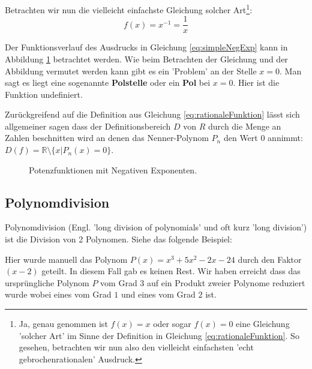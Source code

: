Betrachten wir nun die vielleicht einfachste Gleichung solcher Art\footnote{Ja, genau genommen ist $f(x) = x$ oder sogar $f(x) = 0$ eine Gleichung 'solcher Art' im Sinne der Definition in Gleichung \ref{eq:rationaleFunktion}. So gesehen, betrachten wir nun also den vielleicht einfachsten 'echt gebrochenrationalen' Ausdruck.}:
\begin{equation}
	f(x) = x^{-1} = \frac{1}{x} \label{eq:simpleNegExp}
\end{equation}

Der Funktionsverlauf des Ausdrucks in Gleichung \ref{eq:simpleNegExp} kann in Abbildung \ref{fig:ratio1} betrachtet werden. Wie beim Betrachten der Gleichung und der Abbildung vermutet werden kann gibt es ein 'Problem' an der Stelle $x=0$. Man sagt es liegt eine sogenannte \textbf{Polstelle} oder ein \textbf{Pol} bei $x=0$. Hier ist die Funktion undefiniert. 

Zurückgreifend auf die Definition aus Gleichung \ref{eq:rationaleFunktion} lässt sich allgemeiner sagen dass der Definitionsbereich $D$ von $R$ durch die Menge an Zahlen beschnitten wird an denen das Nenner-Polynom $P_n$ den Wert 0 annimmt: $D(f) = \mathbb{R} \setminus \{x | P_n(x)=0\}$. 


\begin{figure}[H]
	\centering
	
	\caption{Potenzfunktionen mit Negativen Exponenten.}
	\label{fig:ratio1}
\end{figure}





\subsection{Polynomdivision}
Polynomdivision (Engl. 'long division of polynomials' und oft kurz 'long division') ist die Division von 2 Polynomen. 
Siehe das folgende Beispiel:



Hier wurde manuell das Polynom $P(x) = x^{3} + 5 x^{2} - 2 x - 24$ durch den Faktor $(x-2)$ geteilt. In diesem Fall gab es keinen Rest. Wir haben erreicht dass das ursprüngliche Polynom $P$ vom Grad $3$ auf ein Produkt zweier Polynome reduziert wurde wobei eines vom Grad $1$ und eines vom Grad $2$ ist. 

